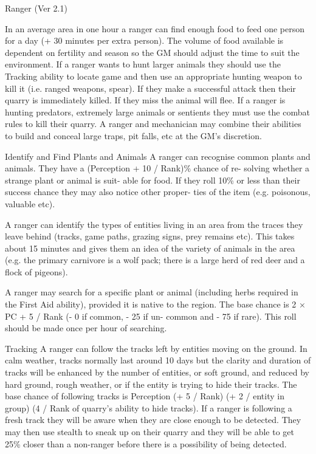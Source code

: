 \begin{Chapter}{Ranger (Ver 2.1)}
\begin{Description}
  In an average area in one hour a ranger can find enough food to feed
  one person for a day (+ 30 minutes per extra person).  The volume of
  food available is dependent on fertility and season so the GM should
  adjust the time to suit the environment.  If a ranger wants to hunt
  larger animals they should use the Tracking ability to locate game
  and then use an appropriate hunting weapon to kill it (i.e.  ranged
  weapons, spear).  If they make a successful attack then their quarry
  is immediately killed.  If they miss the animal will flee.  If a
  ranger is hunting predators, extremely large animals or sentients
  they must use the combat rules to kill their quarry.  A ranger and
  mechanician may combine their abilities to build and conceal large
  traps, pit falls, etc at the GM’s discretion.

\item[Identify and Find Plants and Animals] A ranger can recognise
  common plants and animals.  They have a (Perception + 10 / Rank)\%
  chance of re- solving whether a strange plant or animal is suit-
  able for food.  If they roll 10\% or less than their success chance
  they may also notice other proper- ties of the item (e.g. poisonous,
  valuable etc).

  A ranger can identify the types of entities living in an area from
  the traces they leave behind (tracks, game paths, grazing signs,
  prey remains etc).  This takes about 15 minutes and gives them an
  idea of the variety of animals in the area (e.g. the primary
  carnivore is a wolf pack; there is a large herd of red deer and a
  flock of pigeons).

  A ranger may search for a specific plant or animal (including herbs
  required in the First Aid ability), provided it is native to the
  region. The base chance is 2 × PC + 5 / Rank (- 0 if common, - 25 if
  un- common and - 75 if rare). This roll should be made once per hour
  of searching.

\item[Tracking] A ranger can follow the tracks left by entities moving
  on the ground.  In calm weather, tracks normally last around 10 days
  but the clarity and duration of tracks will be enhanced by the
  number of entities, or soft ground, and reduced by hard ground,
  rough weather, or if the entity is trying to hide their tracks.  The
  base chance of following tracks is Perception (+ 5 / Rank) (+ 2 /
  entity in group) (4 / Rank of quarry’s ability to hide tracks).  If
  a ranger is following a fresh track they will be aware when they are
  close enough to be detected.  They may then use stealth to sneak up
  on their quarry and they will be able to get 25\% closer than a
  non-ranger before there is a possibility of being detected.


\end{Description}
\end{Chapter}
